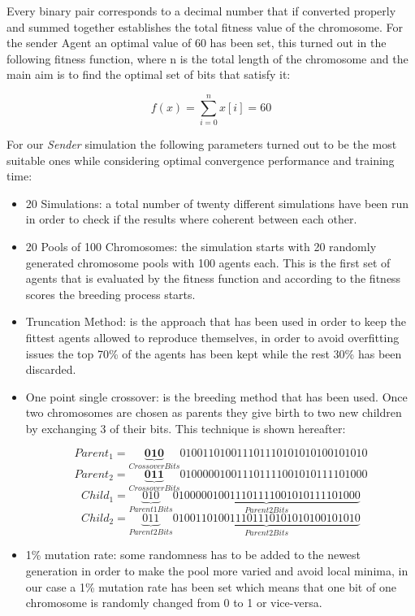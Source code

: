 \documentclass[a4paper]{article}
\begin{document}
Every binary pair corresponds to a decimal number that if converted properly and summed together establishes the total fitness value of the chromosome. For the sender Agent an optimal value of 60 has been set, this turned out in the following fitness function, where n is the total length of the chromosome and the main aim is to find the optimal set of bits that satisfy it:

\begin{equation}
	f(x) = \sum\limits_{i=0}^{n} x[i] = 60
\end{equation} 

For our \textit{Sender} simulation the following parameters turned out to be the most suitable ones while considering optimal convergence performance and training time:

\begin{itemize}

\item 20 Simulations: a total number of twenty different simulations have been run in order to check if the results where coherent between each other.
\item 20 Pools of 100 Chromosomes: the simulation starts with 20 randomly generated chromosome pools with 100 agents each. This is the first set of agents that is evaluated by the fitness function and according to the fitness scores the breeding process starts. 
\item Truncation Method: is the approach that has been used in order to keep the fittest agents allowed to reproduce themselves, in order to avoid overfitting issues the top 70\% of the agents has been kept while the rest 30\% has been discarded.
\item One point single crossover: is the breeding method that has been used. Once two chromosomes are chosen as parents they give birth to two new children by exchanging 3 of their bits. This technique is shown hereafter:

\begin{equation}
	Parent_1 = \underbrace{\textbf{010}}_{Crossover Bits}{010011010011101110101010100101010}
\end{equation}
\begin{equation}
	Parent_2 = \underbrace{\textbf{011}}_{Crossover Bits}{010000010011101111001010111101000}
\end{equation}
\begin{equation}
	Child_1 = \underbrace{010}_{Parent 1 Bits} \underbrace{010000010011101111001010111101000}_{Parent 2 Bits}
\end{equation}
\begin{equation}
	Child_2 = \underbrace{011}_{Parent 2 Bits}\underbrace{010011010011101110101010100101010}_{Parent 2 Bits}
\end{equation}

\item 1\% mutation rate: some randomness has to be added to the newest generation in order to make the pool more varied and avoid local minima, in our case a 1\% mutation rate has been set which means that one bit of one chromosome is randomly changed from 0 to 1 or vice-versa.  

\end{itemize}
\end{document}
